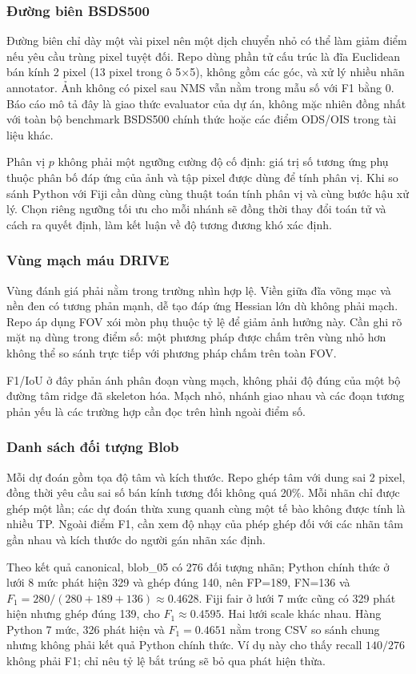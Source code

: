 \subsubsection{Đường biên BSDS500}
Đường biên chỉ dày một vài pixel nên một dịch chuyển nhỏ có thể làm giảm điểm nếu yêu cầu trùng pixel tuyệt đối. Repo dùng phần tử cấu trúc là đĩa Euclidean bán kính 2 pixel (13 pixel trong ô 5$\times$5), không gồm các góc, và xử lý nhiều nhãn annotator. Ảnh không có pixel sau NMS vẫn nằm trong mẫu số với F1 bằng 0. Báo cáo mô tả đây là giao thức evaluator của dự án, không mặc nhiên đồng nhất với toàn bộ benchmark BSDS500 chính thức hoặc các điểm ODS/OIS trong tài liệu khác.

Phân vị $p$ không phải một ngưỡng cường độ cố định: giá trị số tương ứng phụ thuộc phân bố đáp ứng của ảnh và tập pixel được dùng để tính phân vị. Khi so sánh Python với Fiji cần dùng cùng thuật toán tính phân vị và cùng bước hậu xử lý. Chọn riêng ngưỡng tối ưu cho mỗi nhánh sẽ đồng thời thay đổi toán tử và cách ra quyết định, làm kết luận về độ tương đương khó xác định.

\subsubsection{Vùng mạch máu DRIVE}
Vùng đánh giá phải nằm trong trường nhìn hợp lệ. Viền giữa đĩa võng mạc và nền đen có tương phản mạnh, dễ tạo đáp ứng Hessian lớn dù không phải mạch. Repo áp dụng FOV xói mòn phụ thuộc tỷ lệ để giảm ảnh hưởng này. Cần ghi rõ mặt nạ dùng trong điểm số: một phương pháp được chấm trên vùng nhỏ hơn không thể so sánh trực tiếp với phương pháp chấm trên toàn FOV.

F1/IoU ở đây phản ánh phân đoạn vùng mạch, không phải độ đúng của một bộ đường tâm ridge đã skeleton hóa. Mạch nhỏ, nhánh giao nhau và các đoạn tương phản yếu là các trường hợp cần đọc trên hình ngoài điểm số.

\subsubsection{Danh sách đối tượng Blob}
Mỗi dự đoán gồm tọa độ tâm và kích thước. Repo ghép tâm với dung sai 2 pixel, đồng thời yêu cầu sai số bán kính tương đối không quá 20\%. Mỗi nhãn chỉ được ghép một lần; các dự đoán thừa xung quanh cùng một tế bào không được tính là nhiều TP. Ngoài điểm F1, cần xem độ nhạy của phép ghép đối với các nhãn tâm gần nhau và kích thước do người gán nhãn xác định.

Theo kết quả canonical, blob\_05 có 276 đối tượng nhãn; Python chính thức ở lưới 8 mức phát hiện 329 và ghép đúng 140, nên FP=189, FN=136 và $F_1=280/(280+189+136)\approx0.4628$. Fiji fair ở lưới 7 mức cũng có 329 phát hiện nhưng ghép đúng 139, cho $F_1\approx0.4595$. Hai lưới scale khác nhau. Hàng Python 7 mức, 326 phát hiện và $F_1=0.4651$ nằm trong CSV so sánh chung nhưng không phải kết quả Python chính thức. Ví dụ này cho thấy recall $140/276$ không phải F1; chỉ nêu tỷ lệ bắt trúng sẽ bỏ qua phát hiện thừa.

